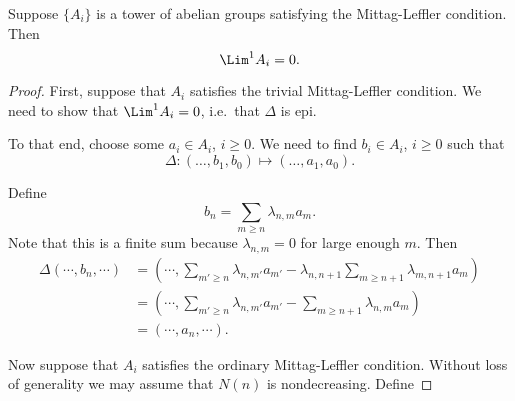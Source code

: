 \documentclass[main.tex]{subfiles}
\begin{document}
\begin{proposition}
  Suppose \(\{A_{i}\}\) is a tower of abelian groups satisfying the Mittag-Leffler condition. Then
  \begin{equation*}
    \Lim^{1} A_{i} = 0.
  \end{equation*}
\end{proposition}
\begin{proof}
  First, suppose that \(A_{i}\) satisfies the trivial Mittag-Leffler condition. We need to show that \(\Lim^{1} A_{i} = 0\), i.e.\ that \(\Delta\) is epi.

  To that end, choose some \(a_{i} \in A_{i}\), \(i \geq 0\). We need to find \(b_{i} \in A_{i}\), \(i \geq 0\) such that
  \begin{equation*}
    \Delta\colon (\ldots, b_{1}, b_{0}) \mapsto (\ldots, a_{1}, a_{0}).
  \end{equation*}

  Define
  \begin{equation*}
    b_{n} = \sum_{m \geq n} \lambda_{n,m}a_{m}.
  \end{equation*}
  Note that this is a finite sum because \(\lambda_{n, m} = 0\) for large enough \(m\). Then
  \begin{align*}
    \Delta(\cdots, b_{n}, \cdots) &= \left( \cdots, \sum_{m' \geq n} \lambda_{n, m'} a_{m'} - \lambda_{n, n+1} \sum_{m \geq n + 1} \lambda_{m, n+1} a_{m} \right) \\
    &= \left(\cdots, \sum_{m' \geq n} \lambda_{n, m'} a_{m'} - \sum_{m \geq n+1} \lambda_{n, m} a_{m} \right) \\
    &= (\cdots, a_{n}, \cdots).
  \end{align*}

  Now suppose that \(A_{i}\) satisfies the ordinary Mittag-Leffler condition. Without loss of generality we may assume that \(N(n)\) is nondecreasing. Define


\end{proof}
\end{document}
